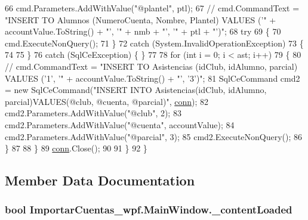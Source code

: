 \begin{DoxyCode}
66                     cmd.Parameters.AddWithValue(\textcolor{stringliteral}{"@plantel"}, ptl);
67 \textcolor{comment}{//                    cmd.CommandText = "INSERT TO Alumnos (NumeroCuenta, Nombre, Plantel) VALUES ('" +
       accountValue.ToString() + "', '" + nmb + "', '" + ptl + "')";}
68                     \textcolor{keywordflow}{try}
69                     \{
70                         cmd.ExecuteNonQuery();
71                     \}
72                     \textcolor{keywordflow}{catch} (System.InvalidOperationException)
73                     \{
74 
75                     \}
76                     \textcolor{keywordflow}{catch} (SqlCeException) \{ \}
77                     
78                     \textcolor{keywordflow}{for} (\textcolor{keywordtype}{int} i = 0; i < ast; i++)
79                         \{
80   \textcolor{comment}{//                      cmd.CommandText = "INSERT TO Asistencias (idClub, idAlumno, parcial) VALUES ('1',
       '" + accountValue.ToString() + "', '3')";}
81                         SqlCeCommand cmd2 = \textcolor{keyword}{new} SqlCeCommand(\textcolor{stringliteral}{"INSERT INTO Asistencias(idClub, idAlumno,
       parcial)VALUES(@club, @cuenta, @parcial)"}, \hyperlink{class_importar_cuentas__wpf_1_1_main_window_a8ed2f7c907bc1c8faf75d8deb555d137}{conn});
82                         cmd2.Parameters.AddWithValue(\textcolor{stringliteral}{"@club"}, 2);
83                         cmd2.Parameters.AddWithValue(\textcolor{stringliteral}{"@cuenta"}, accountValue);
84                         cmd2.Parameters.AddWithValue(\textcolor{stringliteral}{"@parcial"}, 3);
85                         cmd2.ExecuteNonQuery();
86                         \}
87                         
88                     \}
89                 \hyperlink{class_importar_cuentas__wpf_1_1_main_window_a8ed2f7c907bc1c8faf75d8deb555d137}{conn}.Close();
90 
91                 \}
92             \}
\end{DoxyCode}


\subsection{Member Data Documentation}
\hypertarget{class_importar_cuentas__wpf_1_1_main_window_a5548a0e1f3adfe66ff77765ca2907d56}{
\subsubsection[{\-\_\-content\-Loaded}]{\setlength{\rightskip}{0pt plus 5cm}bool Importar\-Cuentas\-\_\-wpf.\-Main\-Window.\-\_\-content\-Loaded\hspace{0.3cm}{\ttfamily [private]}}}\label{class_importar_cuentas__wpf_1_1_main_window_a5548a0e1f3adfe66ff77765ca2907d56}


